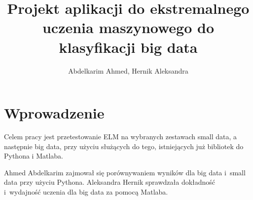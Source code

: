 \documentclass{article}
\title{Projekt aplikacji do ekstremalnego uczenia maszynowego do klasyfikacji big data}
\author{Abdelkarim Ahmed, Hernik Aleksandra}
\date{}
\begin{document}
\renewcommand*\listfigurename{Wykaz rysunków}
\renewcommand*\listtablename{Wykaz tabel}
\clearpage
\vspace*{\fill}
\begin{center}
\begin{minipage}{.9\textwidth}
\maketitle
\end{minipage}
\end{center}
\vfill
\clearpage

\tableofcontents
\clearpage

\section*{Wprowadzenie}
Celem pracy jest przetestowanie ELM na wybranych zestawach small data, a następnie big data, przy użyciu służących do tego, istniejących już bibliotek do Pythona i Matlaba.

Ahmed Abdelkarim zajmował się porównywaniem wyników dla big data i~small data przy użyciu Pythona.
Aleksandra Hernik sprawdzała dokładność i~wydajność uczenia dla big data za pomocą Matlaba.

\clearpage
\end{document}
